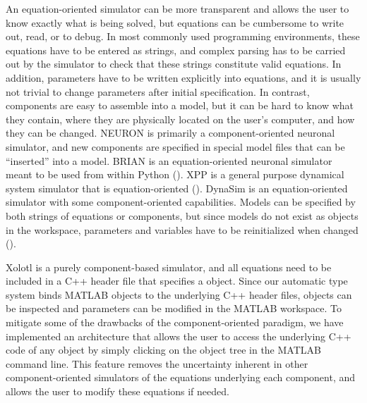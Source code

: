 \documentclass{frontiersSCNS} %
\begin{document}
An equation-oriented simulator can be more transparent and allows the user to know exactly what is being solved, but equations can be cumbersome to write out, read, or to debug. In most commonly used programming environments, these equations have to be entered as strings, and complex parsing has to be carried out by the simulator to check that these strings constitute valid equations. In addition, parameters have to be written explicitly into equations, and it is usually not trivial to change parameters after initial specification. In contrast, components are easy to assemble into a model, but it can be hard to know what they contain, where they are physically located on the user's computer, and how they can be changed. NEURON is primarily a component-oriented neuronal simulator, and new components are specified in special model files that can be ``inserted'' into a model. BRIAN is an equation-oriented neuronal simulator meant to be used from within Python (\cite{goodmanBrianSimulator2009}). XPP is a general purpose dynamical system simulator that is equation-oriented (\cite{ermentrout2002simulating}). DynaSim is an equation-oriented simulator with some component-oriented capabilities. Models can be specified by both strings of equations or components, but since models do not exist as objects in the workspace, parameters and variables have to be reinitialized when changed (\cite{sherfeyDynaSimMATLABToolbox2018}). 

Xolotl is a purely component-based simulator, and all equations need to be included in a C++ header file that specifies a object. Since our automatic type system binds MATLAB objects to the underlying C++ header files, objects can be inspected and parameters can be modified in the MATLAB workspace. To mitigate some of the drawbacks of the component-oriented paradigm, we have implemented an architecture that allows the user to access the underlying C++ code of any object by simply clicking on the object tree in the MATLAB command line. This feature removes the uncertainty inherent in other component-oriented simulators of the equations underlying each component, and allows the user to modify these equations if needed. 
\end{document}
